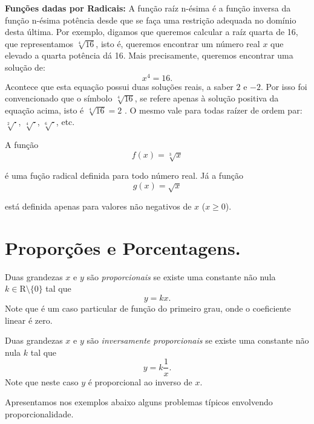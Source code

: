 \noindent\textbf{Funções dadas por Radicais:}  A função raíz n-ésima é a função inversa da função n-ésima potência desde que
se faça  uma restrição adequada no domínio desta última. Por exemplo, digamos que queremos calcular a raíz quarta de
16, que representamos $\sqrt[4]{16}$, isto é, queremos encontrar um número real $x$ que elevado a quarta potência
dá 16. Mais precisamente, queremos encontrar uma solução de:
$$x^4=16.$$
Acontece que esta equação possui duas soluções reais, a saber $2$ e $-2$. Por isso foi convencionado que o símbolo
$\sqrt[4]{16}$, se refere apenas à solução positiva da equação acima, isto é $\sqrt[4]{16}=2$ .
O mesmo vale para todas raízer de ordem par: $\sqrt[2]{\cdot }$, $\sqrt[4]{\cdot}$, $\sqrt[6]{\cdot}$, etc.
\begin{center}
\begin{minipage}{16cm}
\end{minipage}
\end{center}
\begin{exemplo} A função $$f(x)=\sqrt[3]{x}$$

  é uma fução radical definida para todo número real. Já a função $$g(x)= \sqrt{x}$$

está definida apenas para valores não negativos de $x$ ($x\geq 0$).
\end{exemplo}


\section{Proporções e Porcentagens.}

Duas grandezas $x$ e $y$ são \textit{proporcionais} se existe uma constante não nula $k\in \mbox{R}\setminus \{0\}$ tal que $$y=kx.$$ Note que é um caso particular de função do primeiro grau, onde o coeficiente linear é zero.

Duas grandezas $x$ e $y$ são \textit{inversamente proporcionais} se existe uma constante não nula $k$ tal que $$y=k\frac{1}{x}.$$ Note que neste caso $y$ é proporcional ao inverso de $x$.

\clearpage

Apresentamos nos exemplos abaixo alguns problemas típicos envolvendo proporcionalidade.

